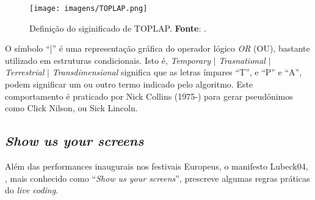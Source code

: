 \begin{figure}[!h]
  \centering
  \texttt{[image: imagens/TOPLAP.png]}
  \caption{Definição do siginificado de TOPLAP. \textbf{Fonte}: .}
  \label{fig:TOPLAP}
\end{figure}

O símbolo ``|'' é uma representação gráfica do operador lógico \emph{OR} (OU), bastante utilizado em estruturas condicionais. Isto é, \emph{Temporary }| \emph{Trasnational} | \emph{Terrestrial} | \emph{Transdimensional} significa que as letras ímpares ``T'', e ``P'' e ``A'', podem significar um ou outro termo indicado pelo algoritmo. Este comportamento é praticado por Nick Collins (1975-) para gerar pseudônimos como Click Nilson, ou Sick Lincoln. 

\subsection{\emph{Show us your screens}}\label{sec:showusyourscreens}

Além das performances inaugurais nos festivais Europeus, o manifesto Lubeck04, , mais conhecido como ``\emph{Show us your screens}'', prescreve algumas regras práticas do \emph{live coding}. 


